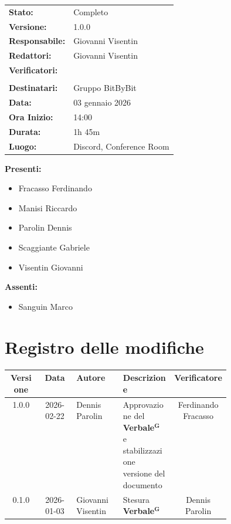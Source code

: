 \documentclass[a4paper,12pt]{article}
\newcommand{\term}[1]{\textbf{#1}$^\mathbf{G}$}
\begin{document}
\begin{tcolorbox}
\begin{tabularx}{\textwidth}{@{}l X@{}}
\textbf{Stato:} & Completo \\
\textbf{Versione:} & 1.0.0 \\
\textbf{Responsabile:} & Giovanni Visentin \\
\textbf{Redattori:} &  Giovanni Visentin \\
\textbf{Verificatori:} & 
\begin{tabular}[t]{@{}l@{}}
     Dennis Parolin\\
\end{tabular}\\
\textbf{Destinatari:} & Gruppo BitByBit \\ 
\textbf{Data:} & 03 gennaio 2026 \\
\textbf{Ora Inizio:} & 14:00 \\
\textbf{Durata:} & 1h 45m \\
\textbf{Luogo:} & Discord, Conference Room \\
\end{tabularx}
\end{tcolorbox}

\textbf{Presenti:} 
\begin{itemize}
    \item Fracasso Ferdinando
    \item Manisi Riccardo
    \item Parolin Dennis
    \item Scaggiante Gabriele
    \item Visentin Giovanni 
\end{itemize} 
\textbf{Assenti:} 
\begin{itemize}
    \item Sanguin Marco
\end{itemize}

\vspace*{\fill} %

\clearpage

\section*{Registro delle modifiche}
\begin{center}
\small
\renewcommand{\arraystretch}{1.2} 
\begin{tabular}{|c|c|p{0.21\linewidth}|p{0.23\linewidth}|c|}
\hline
\rowcolor{gray!60} 
\textbf{Versione} & \textbf{Data} & \textbf{Autore} & \textbf{Descrizione} & \textbf{Verificatore} \\
\hline

\rowcolor{white}
1.0.0 & 2026-02-22 & Dennis Parolin & Approvazione del \term{Verbale} e stabilizzazione versione del documento & Ferdinando Fracasso \\
\hline
\rowcolor{gray!20}
 0.1.0 &  2026-01-03&  Giovanni Visentin &  Stesura \term{Verbale}& Dennis Parolin  \\
\hline
\end{tabular}
\end{center}
\end{document}
